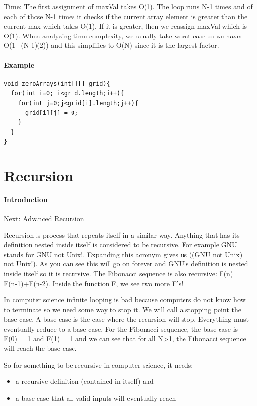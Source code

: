 \documentclass[11pt,oneside]{book}
\begin{document}
Time: The first assignment of maxVal takes O(1). The loop runs N-1 times and of each of those N-1 times it checks if the current array element is greater than the current max which takes O(1). If it is greater, then we reassign maxVal which is O(1). When analyzing time complexity, we usually take worst case so we have: O(1+(N-1)(2)) and this simplifies to O(N) since it is the largest factor.

\subsubsection{Example}

\begin{lstlisting}
void zeroArrays(int[][] grid){
  for(int i=0; i<grid.length;i++){
    for(int j=0;j<grid[i].length;j++){
      grid[i][j] = 0;
    }
  }
}
\end{lstlisting}
\chapter{Recursion}\subsubsection{Introduction}

Next: Advanced Recursion

Recursion is process that repeats itself in a similar way. Anything that has its definition nested inside itself is considered to be recursive. For example GNU stands for GNU not Unix!. Expanding this acronym gives us ((GNU not Unix) not Unix!). As you can see this will go on forever and GNU's definition is nested inside itself so it is recursive. The Fibonacci sequence is also recursive: F(n) = F(n-1)+F(n-2). Inside the function F, we see two more F's!

In computer science infinite looping is bad because computers do not know how to terminate so we need some way to stop it. We will call a stopping point the base case. A base case is the case where the recursion will stop. Everything must eventually reduce to a base case. For the Fibonacci sequence, the base case is F(0) = 1 and F(1) = 1 and we can see that for all N>1, the Fibonacci sequence will reach the base case.

So for something to be recursive in computer science, it needs:

\begin{itemize}
\item a recursive definition (contained in itself) and 
\item a base case that all valid inputs will eventually reach
\end{itemize}
\end{document}
